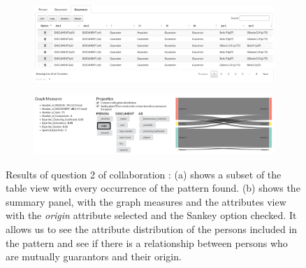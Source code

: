 
\begin{figure}[!ht]
    \centering
    \begin{subfigure}[b]{\linewidth}
        \includegraphics[width=\textwidth]{static/figures/ComBiNet/Piemont-mutual-guarantor-table}
        \includegraphics[width=\textwidth]{static/figures/ComBiNet/mutualGuarantor-table-bottom}
    \caption{}
    \end{subfigure}

    \begin{subfigure}[b]{\linewidth}
            \includegraphics[width=\textwidth]{static/figures/ComBiNet/piemont-mutual-guarantors-results}
    \caption{}
    \end{subfigure}

    \caption{Results of question 2 of collaboration \pascal: (a) shows a subset of the table view with every occurrence of the pattern found. (b) shows the summary panel, with the graph measures and the attributes view with the \textit{origin} attribute selected and the Sankey option checked. It allows us to see the attribute distribution of the persons included in the pattern and see if there is a relationship between persons who are mutually guarantors and their origin.
    }\label{fig:combinet-example-results}
\end{figure}


